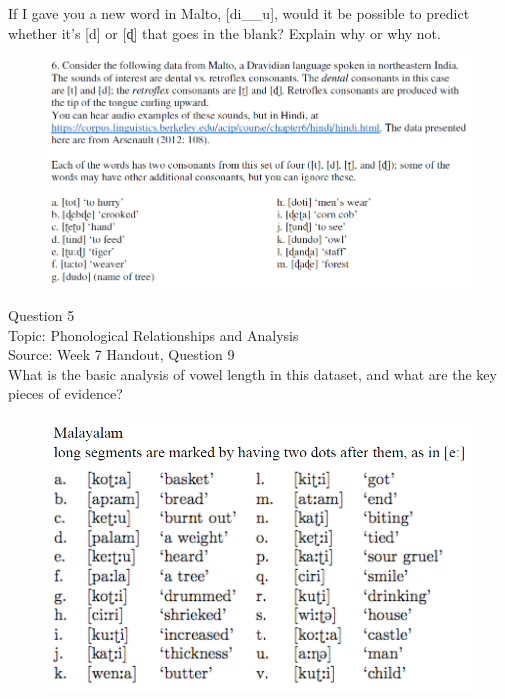 \documentclass[12pt]{article}
\begin{document}
If I gave you a new word in Malto, [di\_\_u], would it be possible to predict whether it's [d] or [ɖ] that goes in the blank? Explain why or why not.\\

\begin{figure}[H]
\includegraphics{../images/malto.png}
\end{figure}

\newpage

{\large Question 5}\\

Topic: Phonological Relationships and Analysis\\
Source: Week 7 Handout, Question 9\\

What is the basic analysis of vowel length in this dataset, and what are the key pieces of evidence?\\

\begin{figure}[H]
\includegraphics{../images/malayalam.png}
\end{figure}
\end{document}
